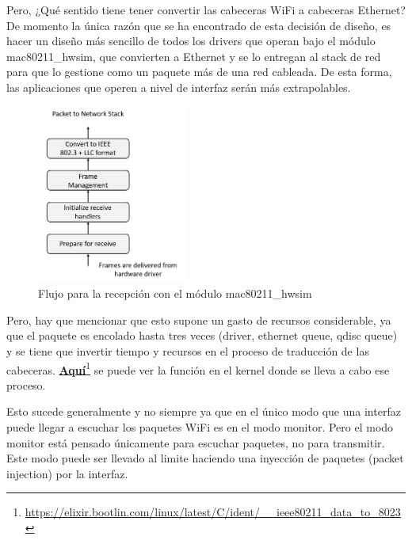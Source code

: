 Pero, ¿Qué sentido tiene tener convertir las cabeceras WiFi a cabeceras Ethernet? De momento la única razón que se ha encontrado de esta decisión de diseño, es hacer un diseño más sencillo de todos los drivers que operan bajo el módulo mac80211\_hwsim, que convierten a Ethernet y se lo entregan al stack de red para que lo gestione como un paquete más de una red cableada. De esta forma, las aplicaciones que operen a nivel de interfaz serán más extrapolables. 

\begin{figure}[ht]
    \centering
    \includegraphics[width=5cm]{archivos/img/dev/p4-wifi/analysis/linux_wireless_subsystem_rx.png}
    \caption{Flujo para la recepción con el módulo mac80211\_hwsim \cite{5415877}}
    \label{fig:analysis_p4_wifi_8}
\end{figure}

Pero, hay que mencionar que esto supone un gasto de recursos considerable, ya que el paquete es encolado hasta tres veces (driver, ethernet queue, qdisc queue) y se tiene que invertir tiempo y recursos en el proceso de traducción de las cabeceras.  \href{https://elixir.bootlin.com/linux/latest/C/ident/__ieee80211_data_to_8023}{\textbf{Aquí}}\footnote{\url{https://elixir.bootlin.com/linux/latest/C/ident/__ieee80211_data_to_8023}} se puede ver la función en el kernel donde se lleva a cabo ese proceso.\\
\par

Esto sucede generalmente y no siempre ya que en el único modo que una interfaz puede llegar a escuchar los paquetes WiFi es en el modo monitor. Pero el modo monitor está pensado únicamente para escuchar paquetes, no para transmitir. Este modo puede ser llevado al limite haciendo una inyección de paquetes (packet injection) por la interfaz.\\
\par

